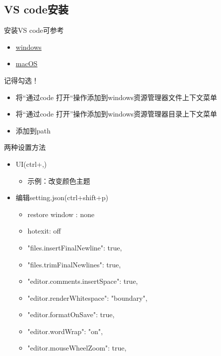 \documentclass{beamer}
\begin{document}
\subsection{VS code安装}
\begin{frame}
    安装VS code可参考
    \begin{itemize}
        \item \href{https://zhuanlan.zhihu.com/p/264785441}{windows}
        \item \href{https://blog.csdn.net/weixin_44176432/article/details/109381781}{macOS}
    \end{itemize}
    {\color{red}记得勾选！}
    \begin{itemize}
        \item 将“通过code 打开“操作添加到windows资源管理器文件上下文菜单
        \item 将“通过code 打开”操作添加到windows资源管理器目录上下文菜单
        \item 添加到path
    \end{itemize}

\end{frame}

\begin{frame}{两种设置方法}
    \begin{itemize}
        \item UI(ctrl+,)
              \begin{itemize}
                  \item 示例：改变颜色主题
              \end{itemize}
        \item 编辑setting.json(ctrl+shift+p)
              \begin{itemize}
                  \item restore window : none
                  \item hotexit: off
                  \item "files.insertFinalNewline": true,
                  \item "files.trimFinalNewlines": true,
                  \item "editor.comments.insertSpace": true,
                  \item "editor.renderWhitespace": "boundary",
                  \item "editor.formatOnSave": true,
                  \item "editor.wordWrap": "on",
                  \item "editor.mouseWheelZoom": true,
              \end{itemize}
    \end{itemize}
\end{frame}
\end{document}
